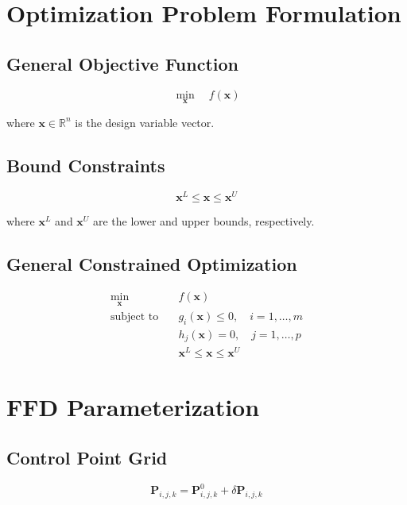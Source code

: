 \documentclass{article}
\begin{document}
\section{Optimization Problem Formulation}

\subsection{General Objective Function}
\begin{equation}
\min_{\mathbf{x}} \quad f(\mathbf{x})
\end{equation}

where $\mathbf{x} \in \mathbb{R}^n$ is the design variable vector.

\subsection{Bound Constraints}
\begin{equation}
\mathbf{x}^L \leq \mathbf{x} \leq \mathbf{x}^U
\end{equation}

where $\mathbf{x}^L$ and $\mathbf{x}^U$ are the lower and upper bounds, respectively.

\subsection{General Constrained Optimization}
\begin{align}
\min_{\mathbf{x}} \quad &f(\mathbf{x}) \\
\text{subject to} \quad &g_i(\mathbf{x}) \leq 0, \quad i = 1, \ldots, m \\
&h_j(\mathbf{x}) = 0, \quad j = 1, \ldots, p \\
&\mathbf{x}^L \leq \mathbf{x} \leq \mathbf{x}^U
\end{align}

\section{FFD Parameterization}

\subsection{Control Point Grid}
\begin{equation}
\mathbf{P}_{i,j,k} = \mathbf{P}_{i,j,k}^0 + \delta \mathbf{P}_{i,j,k}
\end{equation}
\end{document}
